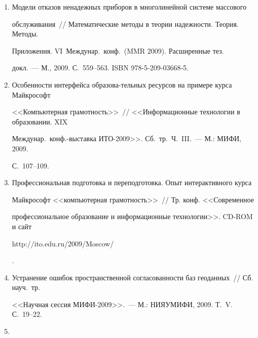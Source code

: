 \begin{enumerate}[1.]
\item {}


Модели отказов ненадежных приборов в многолинейной системе массового 


обслуживания~// Математические методы в теории надежности. Теория. Методы. 


Приложения. VI~Междунар.\ конф.\ (MMR 2009). Расширенные тез.\


докл.~--- М., 2009.  С.~559--563. ISBN 978-5-209-03668-5.





\item {}


Особенности интерфейса образова-\linebreak тельных ресурсов на примере курса Майкрософт 


<<Компьютерная грамотность>>~// <<Информационные технологии в об\-ра\-зо\-ва\-нии. XIX 


Междунар.\ конф.-выставка ИТО-2009>>. Сб.\ тр.\  Ч.~III.~--- М.: МИФИ, 2009. 


С.~107--109.





\item {}


Профессиональная подготовка и переподготовка. Опыт интерактивного курса 


Майкрософт <<компьютерная грамотность>>~// Тр. конф.  <<Современное 


профессиональное образование и информационные технологии>>. CD-ROM и сайт {\sf 


http://ito.edu.ru/2009/Moscow/}.





\item {}


Устранение ошибок пространственной согласованности баз геоданных~// Сб. науч.\ тр. 


<<Научная сессия МИФИ-2009>>.~--- М.:  НИЯУ\linebreak МИФИ, 2009. Т.~V. С.~19--22.





\item {}



\end{enumerate}
